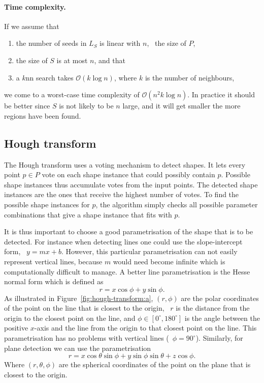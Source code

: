 \paragraph{Time complexity.} If we assume that 
\begin{enumerate}
	\item the number of seeds in $L_{S}$ is linear with $n$, \ie\ the size of $P$,
	\item the size of $S$ is at most $n$, and that
	\item a $k$nn search takes $\mathcal{O}{(k\log{n})}$, where $k$ is the number of neighbours,
\end{enumerate}
we come to a worst-case time complexity of $\mathcal{O}(n^2k\log{n})$.
In practice it should be better since $S$ is not likely to be $n$ large, and it will get smaller the more regions have been found.


\subsection{Hough transform}%

The Hough transform uses a voting mechanism to detect shapes.
It lets every point $p \in P$ vote on each shape instance that could possibly contain $p$.
Possible shape instances thus accumulate votes from the input points.
The detected shape instances are the ones that receive the highest number of votes.
To find the possible shape instances for $p$, the algorithm simply checks all possible parameter combinations that give a shape instance that fits with $p$.

It is thus important to choose a good parametrisation of the shape that is to be detected.
For instance when detecting lines one could use the slope-intercept form, \ie\ $y = mx+b$. 
However, this particular parametrisation can not easily represent vertical lines, because $m$ would need become infinite which is computationally difficult to manage. 
A better line parametrisation is the Hesse normal form which is defined as 
\[
r = x\cos{\phi} + y\sin{\phi}. 
\]
As illustrated in Figure~\ref{fig:hough-transform:a}, $(r,\phi)$ are the polar coordinates of the point on the line that is closest to the origin, \ie\ $r$ is the distance from the origin to the closest point on the line, and $\phi \in [0^\circ, 180^\circ]$ is the angle between the positive $x$-axis and the line from the origin to that closest point on the line. 
This parametrisation has no problems with vertical lines (\ie\ $\phi=90^{\circ}$).
Similarly, for plane detection we can use the parametrisation
\[
r = x \cos{\theta} \sin{\phi} + y \sin{\phi} \sin{\theta} + z \cos{\phi}.
\]
Where $(r, \theta, \phi)$ are the spherical coordinates of the point on the plane that is closest to the origin.

